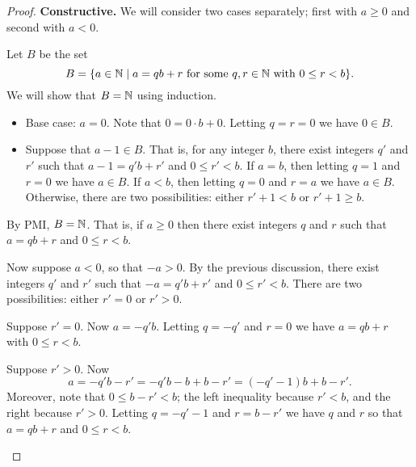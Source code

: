 \begin{proof}
\textbf{Constructive.} We will consider two cases separately; first with \(a \geq 0\) and second with \(a < 0\).

\begin{inlineproplist}
\item Let \(B\) be the set \[ B = \{ a \in \mathbb{N} \mid a = qb + r\ \mathrm{for\ some}\ q,r \in \mathbb{N}\ \mathrm{with}\ 0 \leq r < b \}. \]
We will show that \(B = \mathbb{N}\) using induction.
\begin{itemize}
\item Base case: \(a = 0\). Note that \(0 = 0 \cdot b + 0\).
Letting \(q = r = 0\) we have \(0 \in B\).
\item Suppose that \(a-1 \in B\).
That is, for any integer \(b\), there exist integers \(q'\) and \(r'\) such that \(a-1 = q'b + r'\) and \(0 \leq r' < b\).
If \(a = b\), then letting \(q = 1\) and \(r = 0\) we have \(a \in B\).
If \(a < b\), then letting \(q = 0\) and \(r = a\) we have \(a \in B\).
Otherwise, there are two possibilities: either \(r'+1 < b\) or \(r'+1 \geq b\).
%
\end{itemize}%
By PMI, \(B = \mathbb{N}\).
That is, if \(a \geq 0\) then there exist integers \(q\) and \(r\) such that \(a = qb + r\) and \(0 \leq r < b\).

\item Now suppose \(a < 0\), so that \(-a > 0\).
By the previous discussion, there exist integers \(q'\) and \(r'\) such that \(-a = q'b + r'\) and \(0 \leq r' < b\).
There are two possibilities: either \(r' = 0\) or \(r' > 0\).
\begin{inlinecaselist}
\item  Suppose \(r' = 0\).
Now \(a = -q'b\).
Letting \(q = -q'\) and \(r = 0\) we have \(a = qb+r\) with \(0 \leq r < b\).
\item  Suppose \(r' > 0\).
Now \[ a = -q'b - r' = -q'b - b + b - r' = (-q'-1)b + b-r'. \]
Moreover, note that \(0 \leq b-r' < b\); the left inequality because \(r' < b\), and the right because \(r' > 0\).
Letting \(q = -q'-1\) and \(r = b-r'\) we have \(q\) and \(r\) so that \(a = qb+r\) and \(0 \leq r < b\).
\end{inlinecaselist}
\end{inlineproplist}
\end{proof}


